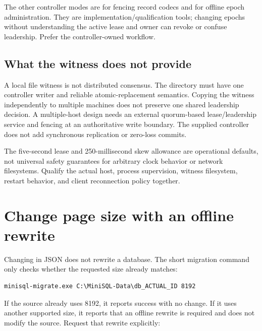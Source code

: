 The other controller modes are  for fencing record codecs
and  for offline
epoch administration. They are implementation/qualification tools; changing
epochs without understanding the active lease and owner can revoke or confuse
leadership. Prefer the controller-owned workflow.

\subsection{What the witness does not provide}

A local file witness is not distributed consensus. The directory must have
one controller writer and reliable atomic-replacement semantics. Copying the
witness independently to multiple machines does not preserve one shared
leadership decision. A multiple-host design needs an external quorum-based
lease/leadership service and fencing at an authoritative write boundary.
The supplied controller does not add synchronous replication or zero-loss
commits.

The five-second lease and 250-millisecond skew allowance are operational
defaults, not universal safety guarantees for arbitrary clock behavior or
network filesystems. Qualify the actual host, process supervision, witness
filesystem, restart behavior, and client reconnection policy together.


\section{Change page size with an offline rewrite}

Changing  in JSON does not rewrite a
database. The short migration command only checks whether the requested size
already matches:

\begin{lstlisting}
minisql-migrate.exe C:\MiniSQL-Data\db_ACTUAL_ID 8192
\end{lstlisting}

If the source already uses 8192, it reports success with no change. If it
uses another supported size, it reports that an offline rewrite is required
and does not modify the source. Request that rewrite explicitly:

